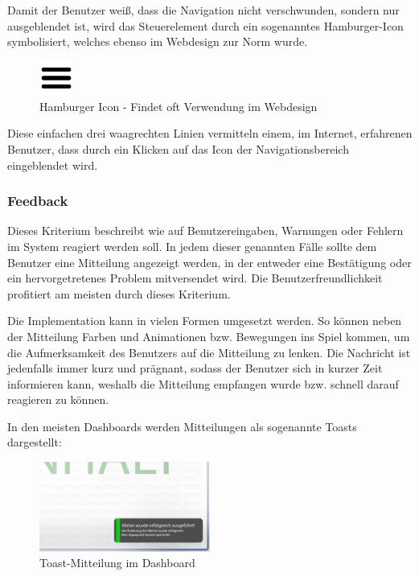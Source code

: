 \newpage
Damit der Benutzer weiß, dass die Navigation nicht verschwunden, sondern nur ausgeblendet ist, wird das Steuerelement durch ein sogenanntes Hamburger-Icon symbolisiert, welches ebenso im Webdesign zur Norm wurde. \cite{hamburger}

\begin{figure}[ht]
    \centering
	\includegraphics[width=0.1\textwidth]{images/hamburger-icon}
	\caption{Hamburger Icon - Findet oft Verwendung im Webdesign}
\end{figure}

Diese einfachen drei waagrechten Linien vermitteln einem, im Internet, erfahrenen Benutzer, dass durch ein Klicken auf das Icon der Navigationsbereich eingeblendet wird.

\subsubsection{Feedback}
\label{sec:feedback}
Dieses Kriterium beschreibt wie auf Benutzereingaben, Warnungen oder Fehlern im System reagiert werden soll. In jedem dieser genannten Fälle sollte dem Benutzer eine Mitteilung angezeigt werden, in der entweder eine Bestätigung oder ein hervorgetretenes Problem mitversendet wird. Die Benutzerfreundlichkeit profitiert am meisten durch dieses Kriterium.

Die Implementation kann in vielen Formen umgesetzt werden. So können neben der Mitteilung Farben und Animationen bzw. Bewegungen ins Spiel kommen, um die Aufmerksamkeit des Benutzers auf die Mitteilung zu lenken. Die Nachricht ist jedenfalls immer kurz und prägnant, sodass der Benutzer sich in kurzer Zeit informieren kann, weshalb die Mitteilung empfangen wurde bzw. schnell darauf reagieren zu können.

In den meisten Dashboards werden Mitteilungen als sogenannte Toasts dargestellt:

\begin{figure}[ht]
    \centering
	\includegraphics[width=0.5\textwidth]{images/dashboard-feedback}
	\caption{Toast-Mitteilung im Dashboard}
\end{figure}

